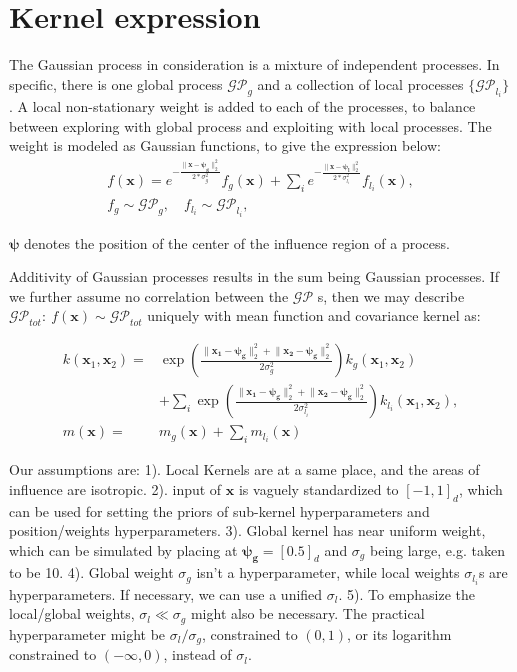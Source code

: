 \documentclass{article}
\begin{document}
\section{Kernel expression}

The Gaussian process in consideration is a mixture of independent processes. In specific, there is one global process $\mathcal{GP}_{g}$ and a collection of local processes $\{\mathcal{GP}_{l_i}\}$. A local non-stationary weight is added to each of the processes, to balance between exploring with global process and exploiting with local processes. The weight is modeled as Gaussian functions, to give the expression below:
\begin{gather*}
    f(\mathbf{x}) = e^{-\frac{\lVert \mathbf{x}-\pmb{\psi_g}\rVert_2^2}{2*\sigma_g^2}} f_{g}(\mathbf{x}) + \sum_i e^{-\frac{\lVert \mathbf{x}-\pmb{\psi_l}\rVert_2^2}{2*\sigma_{l_i}^2}} f_{l_i}(\mathbf{x}),\\
    f_{g} \sim \mathcal{GP}_{g},\quad f_{l_i} \sim \mathcal{GP}_{l_i},
\end{gather*}

$\pmb{\psi}$ denotes the position of the center of the influence region of a process.

Additivity of Gaussian processes results in the sum being Gaussian processes. If we further assume no correlation between the $\mathcal{GP}$ s, then we may describe $\mathcal{GP}_{tot}:\ f(\mathbf{x})\sim\mathcal{GP}_{tot}$ uniquely with mean function and covariance kernel as:

\begin{align*}
    k(\mathbf x_1, \mathbf x_2) = &\exp\left(\frac{\lVert \mathbf{x_1}-\pmb{\psi_g}\rVert_2^2 + \lVert \mathbf{x_2}-\pmb{\psi_g}\rVert_2^2}{2\sigma_g^2}\right)k_g(\mathbf x_1, \mathbf x_2)\\
    &+\sum_i \exp\left(\frac{\lVert \mathbf{x_1}-\pmb{\psi_g}\rVert_2^2 + \lVert \mathbf{x_2}-\pmb{\psi_g}\rVert_2^2}{2\sigma_{l_i}^2}\right)k_{l_i}(\mathbf x_1, \mathbf x_2),\\
        m(\mathbf x) = & m_g(\mathbf{x}) + \sum_i m_{l_i}(\mathbf{x}) 
\end{align*}


Our assumptions are: 1). Local Kernels are at a same place, and the areas of influence are isotropic. 2). input of $\mathbf x$ is vaguely standardized to $[-1,1]_d$, which can be used for setting the priors of sub-kernel hyperparameters and position/weights hyperparameters. 3). Global kernel has near uniform weight, which can be simulated by placing at $\pmb{\psi_g} = [0.5]_d$ and $\sigma_g$ being large, e.g. taken to be 10. 4). Global weight $\sigma_g$ isn't a hyperparameter, while local weights $\sigma_{l_i}$s are hyperparameters. If necessary, we can use a unified $\sigma_{l}$. 5). To emphasize the local/global weights, $\sigma_l \ll \sigma_g$ might also be necessary. The practical hyperparameter might be $\sigma_l/\sigma_g$, constrained to $(0,1)$, or its logarithm constrained to $(-\infty,0)$, instead of $\sigma_l$.
\end{document}
